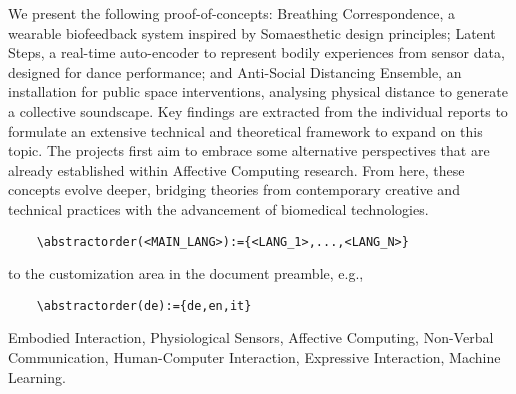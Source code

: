 We present the following proof-of-concepts: Breathing Correspondence, a wearable biofeedback system inspired by Somaesthetic design principles; Latent Steps, a real-time auto-encoder to represent bodily experiences from sensor data, designed for dance performance; and Anti-Social Distancing Ensemble, an installation for public space interventions, analysing physical distance to generate a collective soundscape. Key findings are extracted from the individual reports to formulate an extensive technical and theoretical framework to expand on this topic. The projects first aim to embrace some alternative perspectives that are already established within Affective Computing research. From here, these concepts evolve deeper, bridging theories from contemporary creative and technical practices with the advancement of biomedical technologies.

\begin{verbatim}
    \abstractorder(<MAIN_LANG>):={<LANG_1>,...,<LANG_N>}
\end{verbatim}
\noindent to the customization area in the document preamble, e.g.,
\begin{verbatim}
    \abstractorder(de):={de,en,it}
\end{verbatim}

\begin{keywords}
Embodied Interaction, Physiological Sensors, Affective Computing, Non-Verbal Communication, Human-Computer Interaction, Expressive Interaction, Machine Learning.
\end{keywords} 
